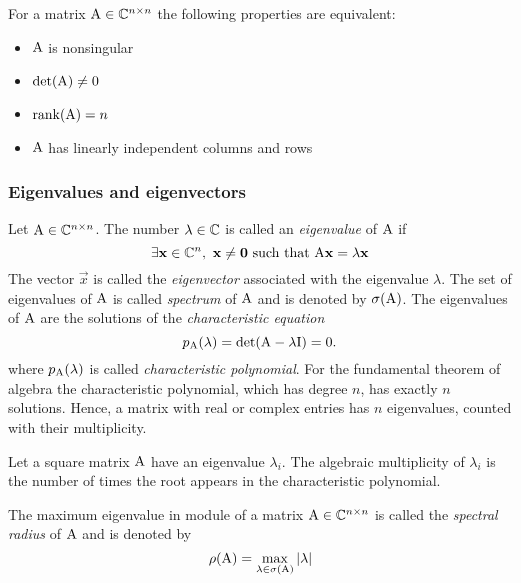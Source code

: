 \begin{proposition}
    For a matrix $\mathrm{A} \in \mathbb{C}^{n \times n}$ the following properties are equivalent:
    \begin{itemize}
        \item $\mathrm{A}$ is nonsingular
        \item $\mathrm{det}{(\mathrm{A})} \neq 0$
        \item $\mathrm{rank}(\mathrm{A}) = n$
        \item $\mathrm{A}$ has linearly independent columns and rows
    \end{itemize}
\end{proposition}



\subsubsection{Eigenvalues and eigenvectors}

\begin{definition}
    Let $\mathrm{A} \in \mathbb{C}^{n\times n}$. The number $\lambda \in \mathbb{C}$ is called an \textit{eigenvalue} of $\mathrm{A}$ if
    $$ \exists \mathbf{x} \in \mathbb{C}^n,\ \mathbf{x} \neq \mathbf{0}\ \text{such that } \mathrm{A}\mathbf{x} = \lambda\mathbf{x} $$
    The vector $\vec{x}$ is called the \textit{eigenvector} associated with the eigenvalue $\lambda$. The set of eigenvalues of $\mathrm{A}$ is called \textit{spectrum} of $\mathrm{A}$ and is denoted by $\sigma(\mathrm{A})$. The eigenvalues of $\mathrm{A}$ are the solutions of the \textit{characteristic equation}
    $$ p_{\mathrm{A}}(\lambda) = \mathrm{det}{(\mathrm{A} - \lambda\mathrm{I})} = 0. $$
    where $p_{\mathrm{A}}(\lambda)$ is called \textit{characteristic polynomial}. For the fundamental theorem of algebra the characteristic polynomial, which has degree $n$, has exactly $n$ solutions. Hence, a matrix with real or complex entries has $n$ eigenvalues, counted with their multiplicity.
\end{definition}

\begin{definition}
Let a square matrix $\mathrm{A}$ have an eigenvalue $\lambda_i$. The algebraic multiplicity of $\lambda_i$ is the number of times the root appears in the characteristic polynomial.
\end{definition}

\begin{definition}
    The maximum  eigenvalue in module of a matrix $\mathrm{A} \in \mathbb{C}^{n \times n}$ is called the \textit{spectral radius} of $\mathrm{A}$ and is denoted by
    $$ \rho(\mathrm{A}) = \max_{\lambda \in \sigma(\mathrm{A})}{\left\vert \lambda \right\vert} $$
\end{definition}

